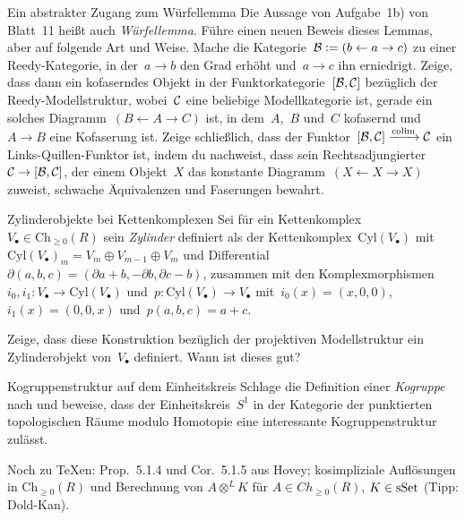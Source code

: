 \documentclass{uebblatt}
\newcommand{\Ch}{\mathrm{Ch}}
\newcommand{\Cyl}{\mathrm{Cyl}}
\begin{document}

\begin{aufgabe}{Ein abstrakter Zugang zum Würfellemma}
Die Aussage von Aufgabe~1b) von Blatt~11 heißt auch \emph{Würfellemma}. Führe
einen neuen Beweis dieses Lemmas, aber auf folgende Art und Weise. Mache die
Kategorie~$\mathcal{B} \vcentcolon= (b \leftarrow a \rightarrow c)$ zu einer Reedy-Kategorie,
in der~$a \to b$ den Grad erhöht und~$a \to c$ ihn erniedrigt. Zeige, dass dann
ein kofaserndes Objekt in der Funktorkategorie~$[\mathcal{B},\mathcal{C}]$ bezüglich der
Reedy-Modellstruktur, wobei~$\mathcal{C}$ eine beliebige Modellkategorie ist, gerade ein
solches Diagramm~$(B \leftarrow A \rightarrow C)$ ist, in dem~$A$,~$B$ und~$C$ kofasernd
und~$A \to B$ eine Kofaserung ist. Zeige schließlich, dass der Funktor~$[\mathcal{B},\mathcal{C}]
\xrightarrow{\operatorname*{colim}} \mathcal{C}$ ein Links-Quillen-Funktor ist, indem du nachweist, dass sein
Rechtsadjungierter~$\mathcal{C} \to [\mathcal{B},\mathcal{C}]$, der einem Objekt~$X$ das konstante
Diagramm~$(X \leftarrow X \rightarrow X)$ zuweist, schwache Äquivalenzen und
Faserungen bewahrt.
\end{aufgabe}

\begin{aufgabe}{Zylinderobjekte bei Kettenkomplexen}
Sei für ein Kettenkomplex~$V_\bullet \in \Ch_{\geq0}(R)$ sein \emph{Zylinder}
definiert als der Kettenkomplex~$\Cyl(V_\bullet)$ mit~$\Cyl(V_\bullet)_m = V_m
\oplus V_{m-1} \oplus V_m$ und Differential~$\partial(a,b,c) = (\partial a + b,
-\partial b, \partial c - b)$, zusammen mit den Komplexmorphismen~$i_0, i_1 :
V_\bullet \to \Cyl(V_\bullet)$ und~$p : \Cyl(V_\bullet) \to V_\bullet$
mit~$i_0(x) = (x,0,0)$, $i_1(x) = (0,0,x)$ und~$p(a,b,c) = a+c$.

Zeige, dass diese Konstruktion bezüglich der projektiven Modellstruktur ein
Zylinderobjekt von~$V_\bullet$ definiert. Wann ist dieses gut?
\end{aufgabe}

\begin{aufgabe}{Kogruppenstruktur auf dem Einheitskreis}
Schlage die Definition einer \emph{Kogruppe} nach und beweise, dass der
Einheitskreis~$S^1$ in der Kategorie der punktierten topologischen Räume
modulo Homotopie eine interessante Kogruppenstruktur zulässt.
\end{aufgabe}

Noch zu \TeX en: Prop.~5.1.4 und Cor.~5.1.5 aus Hovey; kosimpliziale
Auflösungen in $\Ch_{\geq0}(R)$ und Berechnung von $A \otimes^L K$
für $A \in Ch_{\geq0}(R)$, $K \in \mathrm{sSet}$ (Tipp: Dold-Kan).
\end{document}
